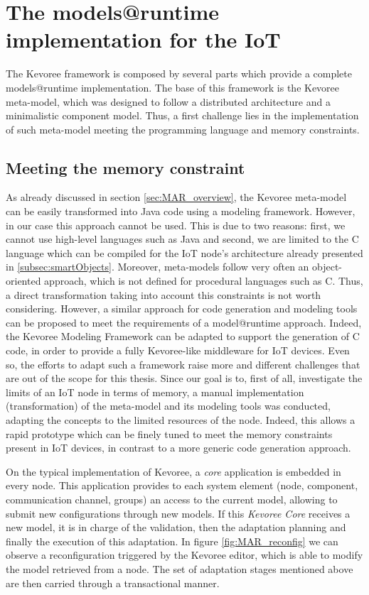 \section{The models@runtime implementation for the IoT}
\label{sec:kevAndIoT}
The Kevoree framework is composed by several parts which provide a complete models@runtime implementation.
The base of this framework is the Kevoree meta-model, which was designed to follow a distributed architecture and a minimalistic component model.
Thus, a first challenge lies in the implementation of such meta-model meeting the programming language and memory constraints.

\subsection{Meeting the memory constraint}
As already discussed in section \ref{sec:MAR_overview}, the Kevoree meta-model can be easily transformed into Java code using a modeling framework.
However, in our case this approach cannot be used.
This is due to two reasons: first, we cannot use high-level languages such as Java and second, we are limited to the C language which can be compiled for the IoT node's architecture already presented in \ref{subsec:smartObjects}.
Moreover, meta-models follow very often an object-oriented approach, which is not defined for procedural languages such as C.
Thus, a direct transformation taking into account this constraints is not worth considering.
However, a similar approach for code generation and modeling tools can be proposed to meet the requirements of a model@runtime approach.
Indeed, the Kevoree Modeling Framework\cite{fouquet2012eclipse} can be adapted to support the generation of C code, in order to provide a fully Kevoree-like middleware for IoT devices.
Even so, the efforts to adapt such a framework raise more and different challenges that are out of the scope for this thesis.
Since our goal is to, first of all, investigate the limits of an IoT node in terms of memory, a manual implementation (transformation) of the meta-model and its modeling tools was conducted, adapting the concepts to the limited resources of the node.
Indeed, this allows a rapid prototype which can be finely tuned to meet the memory constraints present in IoT devices, in contrast to a more generic code generation approach.

On the typical implementation of Kevoree, a \textit{core} application is embedded in every node. 
This application provides to each system element (node, component, communication channel, groups) an access to the current model, allowing to submit new configurations through new models.
If this \textit{Kevoree Core} receives a new model, it is in charge of the validation, then the adaptation planning and finally the execution of this adaptation.
In figure \ref{fig:MAR_reconfig} we can observe a reconfiguration triggered by the Kevoree editor, which is able to modify the model retrieved from a node.  The set of adaptation stages mentioned above are then carried through a transactional manner.

